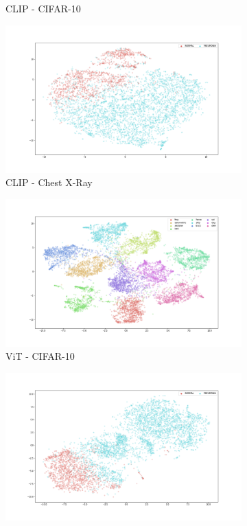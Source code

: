 \documentclass{article}
\theoremstyle{definition}
\begin{document}
\begin{figure}[h!]
\begin{subfigure}{.48\textwidth}
        \caption{CLIP - CIFAR-10}
    \end{subfigure}
    \begin{subfigure}{.48\textwidth}
        \includegraphics[width=\linewidth]{Final project/img/ChestXRay_clip-vit-base-patch32_train.png}
        \caption{CLIP - Chest X-Ray}
    \end{subfigure}
    \begin{subfigure}{.48\textwidth}
        \includegraphics[width=\linewidth]{Final project/img/CIFAR10_vit-base-patch32-384_train.png}
        \caption{ViT - CIFAR-10}
    \end{subfigure}
    \begin{subfigure}{.48\textwidth}
        \includegraphics[width=\linewidth]{Final project/img/ChestXRay_vit-base-patch32-384_train.png}

\end{subfigure}
\end{figure}
\end{document}
